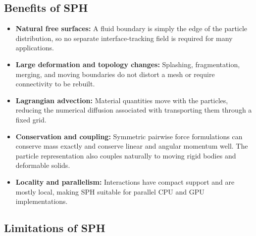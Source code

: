 \documentclass[11pt]{article}
\begin{document}
\subsection{Benefits of SPH}

\begin{itemize}
    \item \textbf{Natural free surfaces:} A fluid boundary is simply the edge
    of the particle distribution, so no separate interface-tracking field is
    required for many applications.
    \item \textbf{Large deformation and topology changes:} Splashing,
    fragmentation, merging, and moving boundaries do not distort a mesh or
    require connectivity to be rebuilt.
    \item \textbf{Lagrangian advection:} Material quantities move with the
    particles, reducing the numerical diffusion associated with transporting
    them through a fixed grid.
    \item \textbf{Conservation and coupling:} Symmetric pairwise force
    formulations can conserve mass exactly and conserve linear and angular
    momentum well. The particle representation also couples naturally to
    moving rigid bodies and deformable solids.
    \item \textbf{Locality and parallelism:} Interactions have compact support
    and are mostly local, making SPH suitable for parallel CPU and GPU
    implementations.
\end{itemize}

\subsection{Limitations of SPH}
\end{document}
